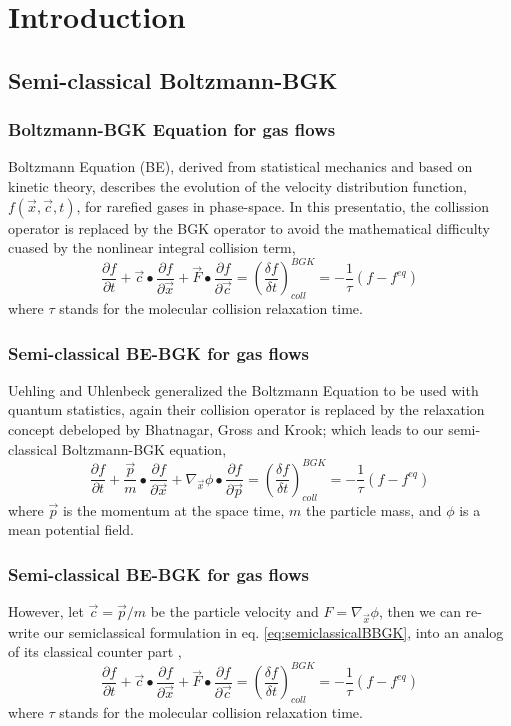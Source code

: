 \section{Introduction}
\subsection{Semi-classical Boltzmann-BGK}

\begin{frame}
	\frametitle{Boltzmann-BGK Equation for gas flows}
	Boltzmann Equation (BE), derived from statistical mechanics and based on kinetic theory, describes the evolution of the velocity distribution function, $f(\vec{x},\vec{c},t)$, for rarefied gases in phase-space. In this presentatio, the collission operator is replaced by the BGK operator to avoid the mathematical difficulty cuased by the nonlinear integral collision term,
	\begin{equation}
	\frac{\partial{f}}{\partial{t}} +
	\vec{c}\bullet\frac{\partial{f}}{\partial{\vec{x}}} +
	\vec{F}\bullet\frac{\partial{f}}{\partial{\vec{c}}} = 
	\left( \frac{\delta f}{\delta t}\right )^{BGK}_{coll} = -\frac{1}{\tau}(f-f^{eq})
	\label{eq:classicalBBGK}
	\end{equation}
	where $\tau$ stands for the molecular collision relaxation time.
\end{frame}

\begin{frame}
	\frametitle{Semi-classical BE-BGK for gas flows}
	Uehling and Uhlenbeck \cite{PhysRev.43.552} generalized the Boltzmann Equation to be used with quantum statistics, again their collision operator is replaced by the relaxation concept debeloped by Bhatnagar, Gross and Krook; which leads to our semi-classical Boltzmann-BGK equation,
	\begin{equation}
	\frac{\partial{f}}{\partial{t}} +
	\frac{\vec{p}}{m}\bullet\frac{\partial{f}}{\partial{\vec{x}}} +
	\nabla_\vec{x}{\phi}\bullet\frac{\partial{f}}{\partial{\vec{p}}} = 
	\left( \frac{\delta f}{\delta t}\right )^{BGK}_{coll} = -\frac{1}{\tau}(f-f^{eq})
	\label{eq:semiclassicalBBGK}
	\end{equation}
	where $\vec{p}$ is the momentum at the space time, $m$ the particle mass, and $\phi$ is a mean potential field.
\end{frame}

\begin{frame}
	\frametitle{Semi-classical BE-BGK for gas flows}
	However, let $\vec{c} = \vec{p} / m$ be the particle velocity and $F = \nabla_\vec{x}{\phi}$, then we can re-write our semiclassical formulation in eq. \ref{eq:semiclassicalBBGK}, into an analog of its classical counter part \cite{Yang2013},
	\begin{equation}
	\frac{\partial{f}}{\partial{t}} +
	\vec{c}\bullet\frac{\partial{f}}{\partial{\vec{x}}} +
	\vec{F}\bullet\frac{\partial{f}}{\partial{\vec{c}}} = 
	\left( \frac{\delta f}{\delta t}\right )^{BGK}_{coll} = -\frac{1}{\tau}(f-f^{eq})
	\label{eq:simplyfied_semiclassicalBBGK}
	\end{equation}
	where $\tau$ stands for the molecular collision relaxation time.
\end{frame}

